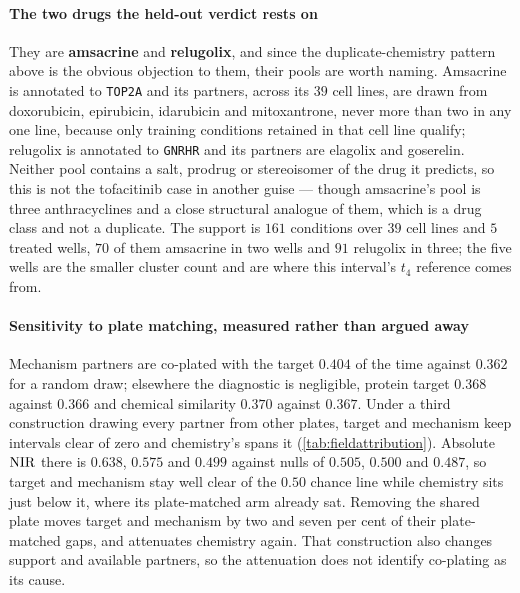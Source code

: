 \paragraph{The two drugs the held-out verdict rests on} They are
\textbf{amsacrine} and \textbf{relugolix}, and since the duplicate-chemistry
pattern above is the obvious objection to them, their pools are worth naming.
Amsacrine is annotated to \texttt{TOP2A} and its partners, across its $39$ cell lines, are drawn from doxorubicin, epirubicin, idarubicin and mitoxantrone, never more than two in any one line, because only training conditions retained in that cell line qualify; relugolix is annotated to \texttt{GNRHR}
and its partners are elagolix and goserelin. Neither pool contains a salt,
prodrug or stereoisomer of the drug it predicts, so this is not the tofacitinib
case in another guise --- though amsacrine's pool is three anthracyclines and a
close structural analogue of them, which is a drug class and not a duplicate. The
support is $\num{161}$ conditions over $39$ cell lines and $5$ treated wells, $70$
of them amsacrine in two wells and $91$ relugolix in three; the five wells are the
smaller cluster count and are where this interval's $t_4$ reference comes
from.

\paragraph{Sensitivity to plate matching, measured rather than argued away}
Mechanism partners are co-plated with the target $0.404$ of the time against
$0.362$ for a random draw; elsewhere the diagnostic is negligible, protein target
$0.368$ against $0.366$ and chemical similarity $0.370$ against $0.367$. Under a
third construction drawing every partner from other plates, target and mechanism
keep intervals clear of zero and chemistry's spans it
(\cref{tab:fieldattribution}). Absolute $\textrm{NIR}$ there is $0.638$, $0.575$ and
$0.499$ against nulls of $0.505$, $0.500$ and $0.487$, so target and mechanism
stay well clear of the $0.50$ chance line while chemistry sits just below it,
where its plate-matched arm already sat. Removing the shared plate moves target
and mechanism by two and seven per cent of their plate-matched gaps, and
attenuates chemistry again. That
construction also changes support and available partners, so the attenuation does
not identify co-plating as its cause.

